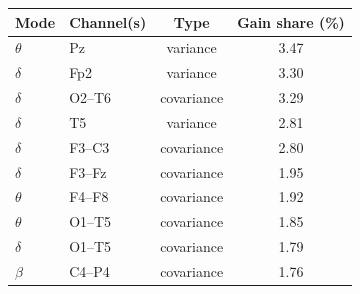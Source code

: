 \small
\begin{tabular}{llcc}
\hline
Mode & Channel(s) & Type & Gain share (\%) \\
\hline
$\theta$ & Pz & variance & 3.47 \\
$\delta$ & Fp2 & variance & 3.30 \\
$\delta$ & O2--T6 & covariance & 3.29 \\
$\delta$ & T5 & variance & 2.81 \\
$\delta$ & F3--C3 & covariance & 2.80 \\
$\delta$ & F3--Fz & covariance & 1.95 \\
$\theta$ & F4--F8 & covariance & 1.92 \\
$\theta$ & O1--T5 & covariance & 1.85 \\
$\delta$ & O1--T5 & covariance & 1.79 \\
$\beta$ & C4--P4 & covariance & 1.76 \\
\hline
\end{tabular}
